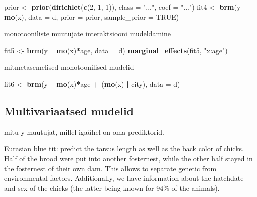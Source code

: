 \documentclass[]{book}
\newenvironment{Shaded}{\begin{snugshade}}{\end{snugshade}}
\newcommand{\DataTypeTok}[1]{\textcolor[rgb]{0.13,0.29,0.53}{#1}}
\newcommand{\DecValTok}[1]{\textcolor[rgb]{0.00,0.00,0.81}{#1}}
\newcommand{\KeywordTok}[1]{\textcolor[rgb]{0.13,0.29,0.53}{\textbf{#1}}}
\newcommand{\NormalTok}[1]{#1}
\newcommand{\OperatorTok}[1]{\textcolor[rgb]{0.81,0.36,0.00}{\textbf{#1}}}
\newcommand{\OtherTok}[1]{\textcolor[rgb]{0.56,0.35,0.01}{#1}}
\newcommand{\StringTok}[1]{\textcolor[rgb]{0.31,0.60,0.02}{#1}}
\begin{document}
\begin{Shaded}
\begin{Highlighting}[]
\NormalTok{prior <-}\StringTok{ }\KeywordTok{prior}\NormalTok{(}\KeywordTok{dirichlet}\NormalTok{(}\KeywordTok{c}\NormalTok{(}\DecValTok{2}\NormalTok{, }\DecValTok{1}\NormalTok{, }\DecValTok{1}\NormalTok{)), }\DataTypeTok{class =} \StringTok{"..."}\NormalTok{, }\DataTypeTok{coef =} \StringTok{"..."}\NormalTok{)}
\NormalTok{fit4 <-}\StringTok{ }\KeywordTok{brm}\NormalTok{(y }\OperatorTok{~}\StringTok{ }\KeywordTok{mo}\NormalTok{(x), }\DataTypeTok{data =}\NormalTok{ d,}
            \DataTypeTok{prior =}\NormalTok{ prior, }\DataTypeTok{sample_prior =} \OtherTok{TRUE}\NormalTok{)}
\end{Highlighting}
\end{Shaded}

monotooniliste muutujate interaktsiooni mudeldamine

\begin{Shaded}
\begin{Highlighting}[]
\NormalTok{fit5 <-}\StringTok{ }\KeywordTok{brm}\NormalTok{(y }\OperatorTok{~}\StringTok{ }\KeywordTok{mo}\NormalTok{(x)}\OperatorTok{*}\NormalTok{age, }\DataTypeTok{data =}\NormalTok{ d)}
\KeywordTok{marginal_effects}\NormalTok{(fit5, }\StringTok{"x:age"}\NormalTok{)}
\end{Highlighting}
\end{Shaded}

mitmetasemelised monotoonilised mudelid

\begin{Shaded}
\begin{Highlighting}[]
\NormalTok{fit6 <-}\StringTok{ }\KeywordTok{brm}\NormalTok{(y }\OperatorTok{~}\StringTok{ }\KeywordTok{mo}\NormalTok{(x)}\OperatorTok{*}\NormalTok{age }\OperatorTok{+}\StringTok{ }\NormalTok{(}\KeywordTok{mo}\NormalTok{(x) }\OperatorTok{|}\StringTok{ }\NormalTok{city), }\DataTypeTok{data =}\NormalTok{ d)}
\end{Highlighting}
\end{Shaded}

\hypertarget{multivariaatsed-mudelid}{%
\subsection{Multivariaatsed mudelid}\label{multivariaatsed-mudelid}}

mitu y muutujat, millel igaühel on oma prediktorid.

Eurasian blue tit: predict the tarsus length as well as the back color of chicks. Half of the brood were put into another fosternest, while the other half stayed in the fosternest of their own dam. This allows to separate genetic from environmental factors. Additionally, we have information about the hatchdate and sex of the chicks (the latter being known for 94\% of the animals).
\end{document}
